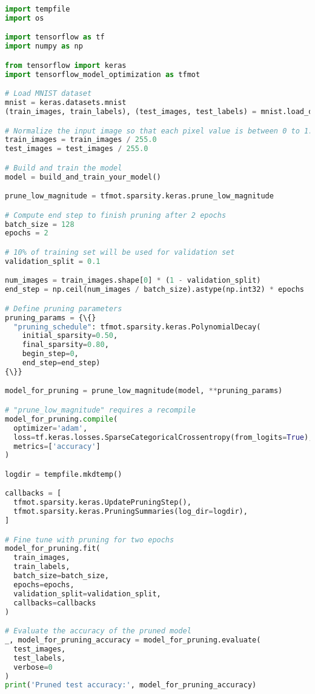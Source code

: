 \begin{lstlisting}[language=Python, label={lst:tfmotpruningexample},
    caption=Pruning example in TFMOT]
import tempfile
import os

import tensorflow as tf
import numpy as np

from tensorflow import keras
import tensorflow_model_optimization as tfmot

# Load MNIST dataset
mnist = keras.datasets.mnist
(train_images, train_labels), (test_images, test_labels) = mnist.load_data()

# Normalize the input image so that each pixel value is between 0 to 1.
train_images = train_images / 255.0
test_images = test_images / 255.0

# Build and train the model
model = build_and_train_your_model()

prune_low_magnitude = tfmot.sparsity.keras.prune_low_magnitude

# Compute end step to finish pruning after 2 epochs
batch_size = 128
epochs = 2

# 10% of training set will be used for validation set
validation_split = 0.1

num_images = train_images.shape[0] * (1 - validation_split)
end_step = np.ceil(num_images / batch_size).astype(np.int32) * epochs

# Define pruning parameters
pruning_params = {\{}
  "pruning_schedule": tfmot.sparsity.keras.PolynomialDecay(
    initial_sparsity=0.50,
    final_sparsity=0.80,
    begin_step=0,
    end_step=end_step)
{\}}

model_for_pruning = prune_low_magnitude(model, **pruning_params)

# "prune_low_magnitude" requires a recompile
model_for_pruning.compile(
  optimizer='adam',
  loss=tf.keras.losses.SparseCategoricalCrossentropy(from_logits=True),
  metrics=['accuracy']
)

logdir = tempfile.mkdtemp()

callbacks = [
  tfmot.sparsity.keras.UpdatePruningStep(),
  tfmot.sparsity.keras.PruningSummaries(log_dir=logdir),
]

# Fine tune with pruning for two epochs
model_for_pruning.fit(
  train_images,
  train_labels,
  batch_size=batch_size,
  epochs=epochs,
  validation_split=validation_split,
  callbacks=callbacks
)

# Evaluate the accuracy of the pruned model
_, model_for_pruning_accuracy = model_for_pruning.evaluate(
  test_images,
  test_labels,
  verbose=0
)
print('Pruned test accuracy:', model_for_pruning_accuracy)
\end{lstlisting}

